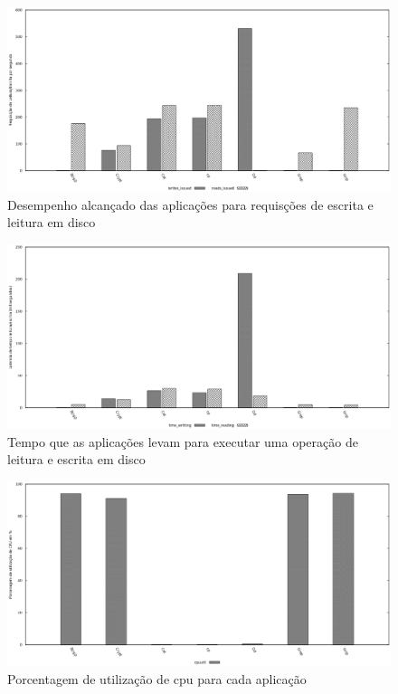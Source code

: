 \begin{figure}[!h]
\centering
\includegraphics [keepaspectratio=true,scale=0.5]{graficos/exp_3_read_write.eps}
\caption{Desempenho alcançado das aplicações para requisções de escrita e leitura em disco}
\label{disk_operations}
\end{figure} 

\begin{figure}[!h]
\centering
\includegraphics [keepaspectratio=true,scale=0.5]{graficos/exp2_latency.eps}
\caption{Tempo que as aplicações levam para executar uma operação de leitura e escrita em disco}
\label{latency_disk}
\end{figure}

\begin{figure}[!h]
\centering
\includegraphics [keepaspectratio=true,scale=0.5]{graficos/exp_3_cpu.eps}
\caption{Porcentagem de utilização de cpu para cada aplicação}
\label{cpu_util}
\end{figure}  

